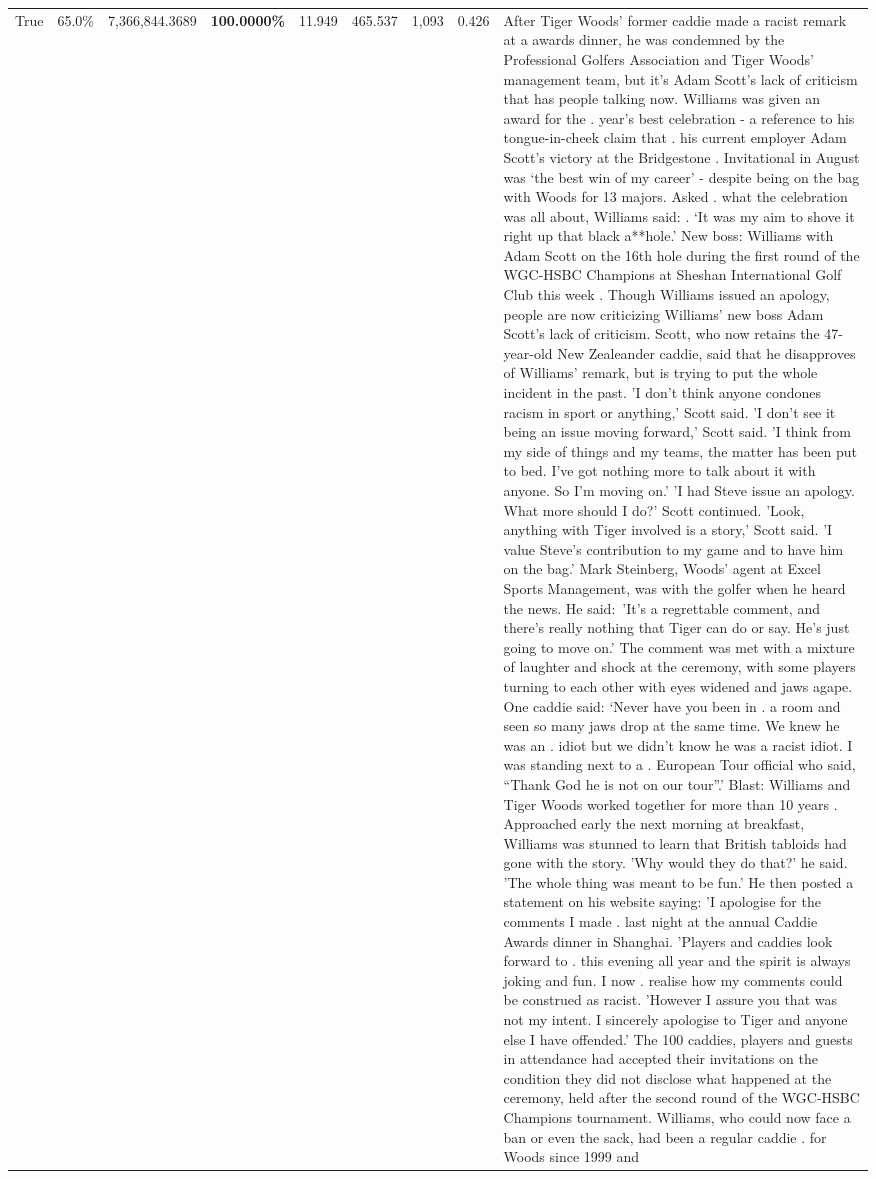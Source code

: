 \begin{table}[H]
\begin{tabular}{lllrlllll}
True & 65.0\% & 7,366,844.3689 & \bfseries \color{red} 100.0000\% & 11.949 & 465.537 & 1,093 & 0.426 & After Tiger Woods' former caddie made a racist remark at a awards dinner, he was condemned by the Professional Golfers Association and Tiger Woods' management team, but it's Adam Scott's lack of criticism that has people talking now. Williams was given an award for the . year’s best celebration - a reference to his tongue-in-cheek claim that . his current employer Adam Scott’s victory at the Bridgestone . Invitational in August was ‘the best win of my career’ - despite being on the bag with Woods for 13 majors. Asked . what the celebration was all about, Williams said: . ‘It was my aim to shove it right up that black a**hole.’ New boss: Williams with Adam Scott  on the 16th hole during the first round of the WGC-HSBC Champions at Sheshan International Golf Club this week . Though Williams issued an apology, people are now criticizing Williams' new boss Adam Scott's lack of criticism. Scott, who now retains the 47-year-old New Zealeander caddie, said that he disapproves of Williams' remark, but is trying to put the whole incident in the past. 'I don't think anyone condones racism in sport or anything,' Scott said. 'I don't see it being an issue moving forward,' Scott said. 'I think from my side of things and my teams, the matter has been put to bed. I've got nothing more to talk about it with anyone. So I'm moving on.' 'I had Steve issue an apology. What more should I do?' Scott continued. 'Look, anything with Tiger involved is a story,' Scott said. 'I value Steve's contribution to my game and to have him on the bag.' Mark Steinberg, Woods' agent at Excel Sports Management, was with the golfer when he heard the news. He said: 'It's a regrettable comment, and there's really nothing that Tiger can do or say. He's just going to move on.' The comment was met with a mixture of laughter and shock at the ceremony, with some players turning to each other with eyes widened and jaws agape. One caddie said: ‘Never have you been in . a room and seen so many jaws drop at the same time. We knew he was an . idiot but we didn’t know he was a racist idiot. I was standing next to a . European Tour official who said, “Thank God he is not on our tour”.’ Blast: Williams and Tiger Woods worked together for more than 10 years . Approached early the next morning at breakfast, Williams was stunned to learn that British tabloids had gone with the story. 'Why would they do that?' he said. 'The whole thing was meant to be fun.' He then posted a statement on his website saying: 'I apologise for the comments I made . last night at the annual Caddie Awards dinner in Shanghai. 'Players and caddies look forward to . this evening all year and the spirit is always joking and fun. I now . realise how my comments could be construed as racist. 'However I assure you that was not my intent. I sincerely apologise to Tiger and anyone else I have offended.' The 100 caddies, players and guests in attendance had accepted their invitations on the condition they did not disclose what happened at the ceremony, held after the second round of the WGC-HSBC Champions tournament. Williams, who could now face a ban or even the sack, had been a regular caddie . for Woods since 1999 and 
\end{tabular}
\end{table}
